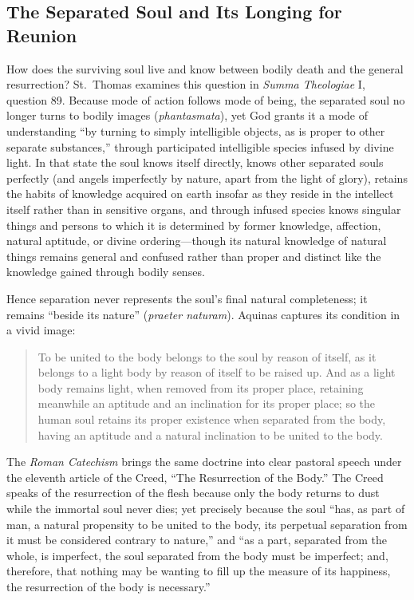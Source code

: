 \subsection{The Separated Soul and Its Longing for Reunion}

How does the surviving soul live and know between bodily death and the general resurrection? St.~Thomas examines this question in \emph{Summa Theologiae} I, question 89. Because mode of action follows mode of being, the separated soul no longer turns to bodily images (\emph{phantasmata}), yet God grants it a mode of understanding ``by turning to simply intelligible objects, as is proper to other separate substances,'' through participated intelligible species infused by divine light. In that state the soul knows itself directly, knows other separated souls perfectly (and angels imperfectly by nature, apart from the light of glory), retains the habits of knowledge acquired on earth insofar as they reside in the intellect itself rather than in sensitive organs, and through infused species knows singular things and persons to which it is determined by former knowledge, affection, natural aptitude, or divine ordering---though its natural knowledge of natural things remains general and confused rather than proper and distinct like the knowledge gained through bodily senses.

Hence separation never represents the soul's final natural completeness; it remains ``beside its nature'' (\emph{praeter naturam}). Aquinas captures its condition in a vivid image:

\begin{quote}
To be united to the body belongs to the soul by reason of itself, as it belongs to a light body by reason of itself to be raised up. And as a light body remains light, when removed from its proper place, retaining meanwhile an aptitude and an inclination for its proper place; so the human soul retains its proper existence when separated from the body, having an aptitude and a natural inclination to be united to the body.
\end{quote}

The \emph{Roman Catechism} brings the same doctrine into clear pastoral speech under the eleventh article of the Creed, ``The Resurrection of the Body.'' The Creed speaks of the resurrection of the flesh because only the body returns to dust while the immortal soul never dies; yet precisely because the soul ``has, as part of man, a natural propensity to be united to the body, its perpetual separation from it must be considered contrary to nature,'' and ``as a part, separated from the whole, is imperfect, the soul separated from the body must be imperfect; and, therefore, that nothing may be wanting to fill up the measure of its happiness, the resurrection of the body is necessary.''

